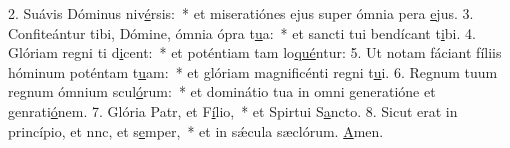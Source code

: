 2. Suávis Dóminus niv\uline{é}rsis:~* et miseratiónes ejus super ómnia pera \uline{e}jus.
3. Confiteántur tibi, Dómine, ómnia ópra t\uline{u}a:~* et sancti tui bendícant t\uline{i}bi.
4. Glóriam regni ti d\uline{i}cent:~* et poténtiam tam lo\uline{qué}ntur:
5. Ut notam fáciant fíliis hóminum poténtam t\uline{u}am:~* et glóriam magnificénti regni t\uline{u}i.
6. Regnum tuum regnum ómnium scul\uline{ó}rum:~* et dominátio tua in omni generatióne et genrati\uline{ó}nem.
7. Glória Patr, et F\uline{í}lio,~* et Spirtui S\uline{a}ncto.
8. Sicut erat in princípio, et nnc, et s\uline{e}mper,~* et in sǽcula sæclórum. \uline{A}men.
